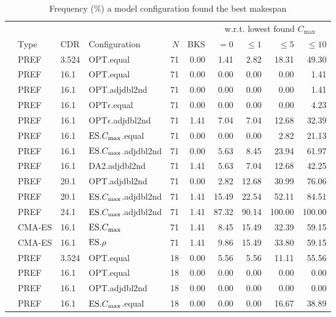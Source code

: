 \begin{table}[p]
\noindent
\caption[Frequency of finding best makespan]{Frequency ($\%$) a model 
    configuration found the best makespan}
\label{tbl:stat:orlib}
\centering
{\setlength{\tabcolsep}{3pt}
\begin{tabular}{llllrrrrrr}
\toprule
& & & & & & \multicolumn{4}{c}{w.r.t. lowest found $C_{\max}$} \\ 
\cmidrule(r){7-10}
& Type & CDR & Configuration & $N$ & BKS & $=0$ & $\leq1$ & $\leq5$ & $\leq10$ 
\\ 
\midrule
\multirow{13}{*}{\rot{\JSP}}
& PREF & 3.524 & OPT.equal & 71 & 0.00 & 1.41 & 2.82 & 18.31 & 49.30 \\ 
& PREF & 16.1 & OPT.equal & 71 & 0.00 & 0.00 & 0.00 & 0.00 & 1.41 \\ 
& PREF & 16.1 & OPT.adjdbl2nd & 71 & 0.00 & 0.00 & 0.00 & 0.00 & 1.41 \\ 
& PREF & 16.1 & OPT$\epsilon$.equal & 71 & 0.00 & 0.00 & 0.00 & 0.00 & 4.23 \\ 
& PREF & 16.1 & OPT$\epsilon$.adjdbl2nd & 71 & 1.41 & 7.04 & 7.04 & 12.68 & 
32.39 \\ 
& PREF & 16.1 & $\text{ES}.{C_{\max}}$.equal & 71 & 0.00 & 0.00 & 0.00 & 2.82 & 21.13 \\ 
& PREF & 16.1 & $\text{ES}.{C_{\max}}$.adjdbl2nd & 71 & 0.00 & 5.63 & 8.45 & 23.94 & 61.97 
 \\ 
& PREF & 16.1 & DA2.adjdbl2nd & 71 & 1.41 & 5.63 & 7.04 & 12.68 & 42.25 
 \\ 
& PREF & 20.1 & OPT.adjdbl2nd & 71 & 0.00 & 2.82 & 12.68 & 30.99 & 76.06 \\ 
& PREF & 20.1 & $\text{ES}.{C_{\max}}$.adjdbl2nd & 71 & 1.41 & 15.49 & 22.54 & 52.11 & 
 84.51 \\ 
& PREF & 24.1 & $\text{ES}.{C_{\max}}$.adjdbl2nd & 71 & 1.41 & 87.32 & 90.14 & 100.00 & 
 100.00 \\ \cmidrule(r){2-10}
& CMA-ES & 16.1 & $\text{ES}.{C_{\max}}$ & 71 & 1.41 & 8.45 & 15.49 & 32.39 & 59.15 \\ 
& CMA-ES & 16.1 & $\text{ES}.{\rho}$ & 71 & 1.41 & 9.86 & 15.49 & 33.80 & 59.15 \\ 
\midrule \multirow{13}{*}{\rot{\FSP}}
& PREF & 3.524 & OPT.equal & 18 & 0.00 & 5.56 & 5.56 & 11.11 & 55.56 \\ 
& PREF & 16.1 & OPT.equal & 18 & 0.00 & 0.00 & 0.00 & 0.00 & 0.00 \\ 
& PREF & 16.1 & OPT.adjdbl2nd & 18 & 0.00 & 0.00 & 0.00 & 0.00 & 0.00 \\ 
& PREF & 16.1 & $\text{ES}.{C_{\max}}$.equal & 18 & 0.00 & 0.00 & 0.00 & 16.67 & 38.89 \\ 

\end{tabular}}
\end{table}
